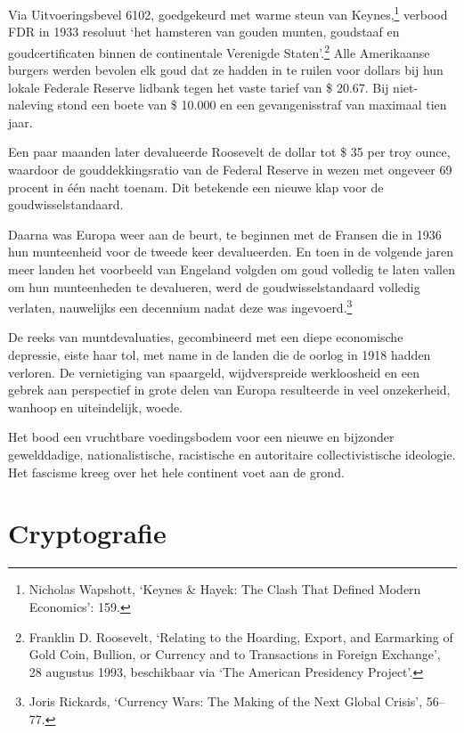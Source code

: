 \documentclass[
  a5paper,
  smalldemyvopaper,11pt,twoside,onecolumn,openright,extrafontsizes]{memoir}
\begin{document}
Via Uitvoeringsbevel 6102, goedgekeurd met warme steun van
Keynes,\footnote{\hspace{0pt}Nicholas Wapshott, `Keynes \& Hayek: The
  Clash That Defined Modern Economics': 159.} verbood FDR in 1933
resoluut `het hamsteren van gouden munten, goudstaaf en goudcertificaten
binnen de continentale Verenigde Staten'.\footnote{\hspace{0pt}Franklin
  D. Roosevelt, `Relating to the Hoarding, Export, and Earmarking of
  Gold Coin, Bullion, or Currency and to Transactions in Foreign
  Exchange', 28 augustus 1993, beschikbaar via `The American Presidency
  Project'.} Alle Amerikaanse burgers werden bevolen elk goud dat ze
hadden in te ruilen voor dollars bij hun lokale Federale Reserve lidbank
tegen het vaste tarief van \$ 20.67. Bij niet-naleving stond een boete
van \$ 10.000 en een gevangenisstraf van maximaal tien jaar.

Een paar maanden later devalueerde Roosevelt de dollar tot \$ 35 per
troy ounce, waardoor de gouddekkingsratio van de Federal Reserve in
wezen met ongeveer 69 procent in één nacht toenam. Dit betekende een
nieuwe klap voor de goudwisselstandaard.

Daarna was Europa weer aan de beurt, te beginnen met de Fransen die in
1936 hun munteenheid voor de tweede keer devalueerden. En toen in de
volgende jaren meer landen het voorbeeld van Engeland volgden om goud
volledig te laten vallen om hun munteenheden te devalueren, werd de
goudwisselstandaard volledig verlaten, nauwelijks een decennium nadat
deze was ingevoerd.\footnote{\hspace{0pt}Joris Rickards, `Currency Wars:
  The Making of the Next Global Crisis', 56--77.}

De reeks van muntdevaluaties, gecombineerd met een diepe economische
depressie, eiste haar tol, met name in de landen die de oorlog in 1918
hadden verloren. De vernietiging van spaargeld, wijdverspreide
werkloosheid en een gebrek aan perspectief in grote delen van Europa
resulteerde in veel onzekerheid, wanhoop en uiteindelijk, woede.

Het bood een vruchtbare voedingsbodem voor een nieuwe en bijzonder
gewelddadige, nationalistische, racistische en autoritaire
collectivistische ideologie. Het fascisme kreeg over het hele continent
voet aan de grond.

\chapter{Cryptografie}\label{cryptografie}
\end{document}
